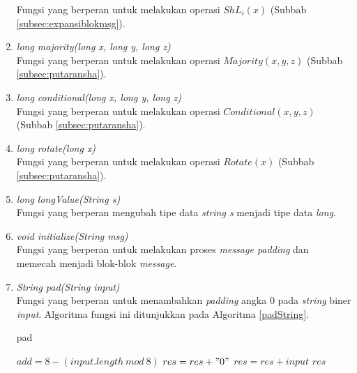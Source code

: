 \begin{enumerate}
	Fungsi yang berperan untuk melakukan operasi \begin{math}ShL_i(x)\end{math} (Subbab \ref{subsec:expansiblokmsg}).
	\item \textit{long majority(long x, long y, long z)} \\
	Fungsi yang berperan untuk melakukan operasi \begin{math}Majority(x,y,z)\end{math} (Subbab \ref{subsec:putaransha}).
	\item \textit{long conditional(long x, long y, long z)} \\
	Fungsi yang berperan untuk melakukan operasi \begin{math}Conditional(x,y,z)\end{math} (Subbab \ref{subsec:putaransha}).
	\item \textit{long rotate(long x)} \\
	Fungsi yang berperan untuk melakukan operasi \begin{math}Rotate(x)\end{math} (Subbab \ref{subsec:putaransha}).
	\item \textit{long longValue(String s)} \\
	Fungsi yang berperan mengubah tipe data \textit{string s} menjadi tipe data \textit{long}.
	\item \textit{void initialize(String msg)} \\
	Fungsi yang berperan untuk melakukan proses \textit{message padding} dan memecah menjadi blok-blok \textit{message}.
	\item \textit{String pad(String input)} \\
	Fungsi yang berperan untuk menambahkan \textit{padding} angka 0 pada \textit{string} biner \textit{input}. Algoritma fungsi ini ditunjukkan pada Algoritma \ref{padString}.
	
	\begin{algorithm}
		\caption{pad}
		\label{padString}
		\begin{algorithmic}[1]
					\State \begin{math}add = 8 - (input.length \: mod\: 8)\end{math}
				\EndIf
					\State $res = res + "0"$
				\EndFor
				\State $res = res + input$
				\State \Return $res$
			\EndFunction
		\end{algorithmic}
	\end{algorithm}
	
\end{enumerate}

